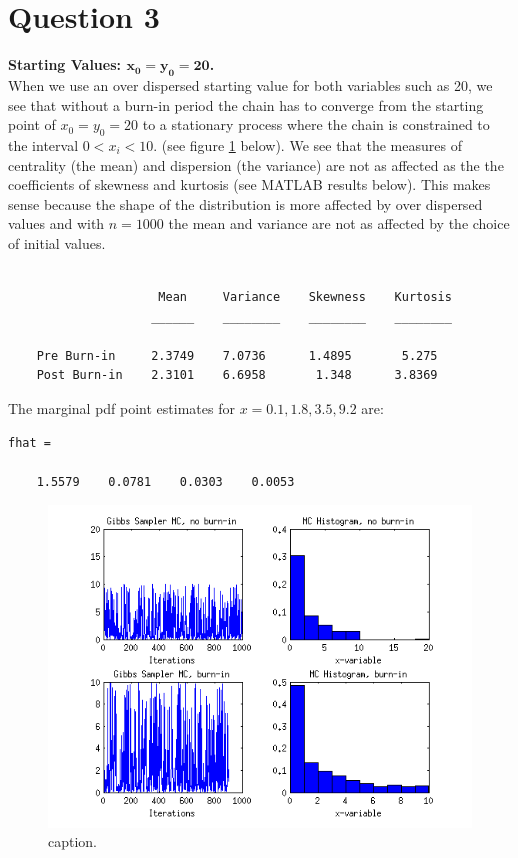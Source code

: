 \documentclass[12pt,a4paper]{article}
\begin{document}
\section*{Question 3}
\textbf{Starting Values: $\mathbf{x_0=y_0=20}$.}\\
When we use an over dispersed starting value for both variables such as 20, we see that without a burn-in period the chain has to converge from the starting point of $x_0=y_0=20$ to a stationary process where the chain is constrained to the interval $0<x_i<10$. (see figure \ref{q3fig1} below). We see that the measures of centrality (the mean) and dispersion (the variance) are not as affected as the the coefficients of skewness and kurtosis (see MATLAB results below). This makes sense because the shape of the distribution is more affected by over dispersed values and with $n=1000$ the mean and variance are not as affected by the choice of initial values.
\begin{verbatim}

                     Mean     Variance    Skewness    Kurtosis
                    ______    ________    ________    ________

    Pre Burn-in     2.3749    7.0736      1.4895       5.275  
    Post Burn-in    2.3101    6.6958       1.348      3.8369  
\end{verbatim}

The marginal pdf point estimates for $x=0.1, 1.8, 3.5, 9.2$ are:
\begin{verbatim}
fhat =

    1.5579    0.0781    0.0303    0.0053
\end{verbatim}

\begin{figure}[ht!] 
\begin{center}
\includegraphics[scale=1]{q3graph1.png}
\caption{caption.}
\label{q3fig1}
\end{center}
\end{figure}
\FloatBarrier
\clearpage
\end{document}
